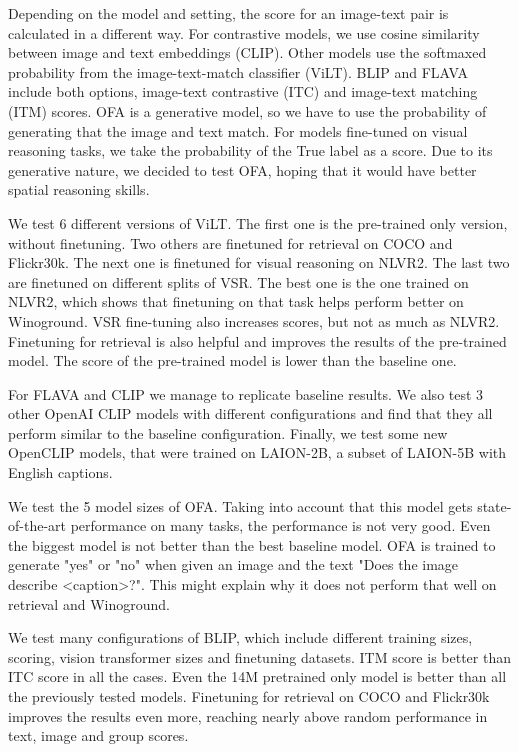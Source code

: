 Depending on the model and setting, the score for an image-text pair is calculated in a different way. For contrastive models, we use cosine similarity between image and text embeddings (CLIP). Other models use the softmaxed probability from the image-text-match classifier (ViLT). BLIP and FLAVA include both options, image-text contrastive (ITC) and image-text matching (ITM) scores. OFA is a generative model, so we have to use the probability of generating that the image and text match. For models fine-tuned on visual reasoning tasks, we take the probability of the True label as a score. Due to its generative nature, we decided to test OFA, hoping that it would have better spatial reasoning skills.

We test 6 different versions of ViLT. The first one is the pre-trained only version, without finetuning. Two others are finetuned for retrieval on COCO and Flickr30k. The next one is finetuned for visual reasoning on NLVR2. The last two are finetuned on different splits of VSR. The best one is the one trained on NLVR2, which shows that finetuning on that task helps perform better on Winoground. VSR fine-tuning also increases scores, but not as much as NLVR2. Finetuning for retrieval is also helpful and improves the results of the pre-trained model. The score of the pre-trained model is lower than the baseline one.

For FLAVA and CLIP we manage to replicate baseline results. We also test 3 other OpenAI CLIP \cite{radford2021clip} models with different configurations and find that they all perform similar to the baseline configuration. Finally, we test some new OpenCLIP \cite{ilharco_gabriel_2021_5143773} models, that were trained on LAION-2B, a subset of LAION-5B \cite{schuhmann2022laionb} with English captions.

We test the 5 model sizes of OFA. Taking into account that this model gets state-of-the-art performance on many tasks, the performance is not very good. Even the biggest model is not better than the best baseline model. OFA is trained to generate "yes" or "no" when given an image and the text "Does the image describe <caption>?". This might explain why it does not perform that well on retrieval and Winoground.

We test many configurations of BLIP, which include different training sizes, scoring, vision transformer sizes and finetuning datasets. ITM score is better than ITC score in all the cases. Even the 14M pretrained only model is better than all the previously tested models. Finetuning for retrieval on COCO and Flickr30k improves the results even more, reaching nearly above random performance in text, image and group scores.


